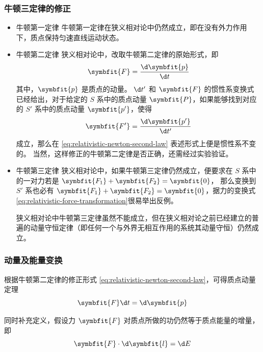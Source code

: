 \subsubsection{牛顿三定律的修正}

\begin{itemize}
    \item 牛顿第一定律
          牛顿第一定律在狭义相对论中仍然成立，即在没有外力作用下，质点保持匀速直线运动状态。
    \item 牛顿第二定律
          狭义相对论中，改取牛顿第二定律的原始形式，即
          \begin{equation}
              \symbfit{F} = \frac{\d \symbfit{p}}{\d t}
              \label{eq:relativistic-newton-second-law}
          \end{equation}
          其中，$\symbfit{p}$ 是质点的动量。
          $\d t'$ 和 $\symbfit{F}$ 的惯性系变换式已经给出，对于给定的 $S$ 系中的质点动量 $\symbfit{P}$，如果能够找到对应的 $S'$ 系中的质点动量 $\symbfit{p'}$，使得
          \begin{equation}
              \symbfit{F'} = \frac{\d \symbfit{p'}}{\d t'}
          \end{equation}
          成立，那么在 \cref{eq:relativistic-newton-second-law} 表述形式上便是惯性系不变的。
          当然，这样修正的牛顿第二定律是否正确，还需经过实验验证。
    \item 牛顿第三定律
          狭义相对论中，如果牛顿第三定律仍然成立，便要求在 $S$ 系中的一对力若是 $\symbfit{F_1} + \symbfit{F_2} = \symbfit{0}$，
          那么变换到 $S'$ 系也必有 $\symbfit{F_1} + \symbfit{F_2} = \symbfit{0}$，据力的变换式 \cref{eq:relativistic-force-transformation}很易举出反例。

          狭义相对论中牛顿第三定律虽然不能成立，但在狭义相对论之前已经建立的普遍的动量守恒定律（即任何一个与外界无相互作用的系统其动量守恒）仍然成立。
\end{itemize}

\subsubsection{动量及能量变换}

根据牛顿第二定律的修正形式 \cref{eq:relativistic-newton-second-law}，可得质点动量定理
\begin{equation}
    \symbfit{F} \d t = \d \symbfit{p}
    \label{eq:relativistic-momentum-theorem}
\end{equation}

同时补充定义，假设力 $\symbfit{F}$ 对质点所做的功仍然等于质点能量的增量，即
\begin{equation}
    \symbfit{F} \cdot \d \symbfit{l} = \d E
    \label{eq:relativistic-work-energy-theorem}
\end{equation}

